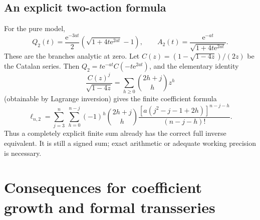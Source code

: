 \documentclass[11pt,a4paper]{article}
\numberwithin{equation}{section}
\theoremstyle{definition}
\theoremstyle{remark}\newtheorem{remark}[theorem]{Remark}
\newcommand{\ee}{\mathrm e}\newcommand{\dd}{\mathrm d}
\begin{document}
\subsection{An explicit two-action formula}
For the pure model,
\begin{equation}
 Q_2(t)=\frac{\ee^{-3at}}2\left(\sqrt{1+4t\ee^{2at}}-1\right),\qquad
 A_2(t)=\frac{\ee^{-at}}{\sqrt{1+4t\ee^{2at}}}.
 \label{eq:Q2}
\end{equation}
These are the branches analytic at zero. Let
$C(z)=(1-\sqrt{1-4z})/(2z)$ be the Catalan series.
Then $Q_2=t\ee^{-at}C(-t\ee^{2at})$, and the elementary identity
\[
 \frac{C(z)^j}{\sqrt{1-4z}}=
 \sum_{h\ge0}\binom{2h+j}{h}z^h
\]
(obtainable by Lagrange inversion) gives the finite coefficient formula
\begin{equation}
 \ell_{n,2}=\sum_{j=3}^n\ \sum_{h=0}^{n-j}
 (-1)^h\binom{2h+j}{h}
 \frac{\left[a(j^2-j-1+2h)\right]^{n-j-h}}{(n-j-h)!}.
 \label{eq:L2exact}
\end{equation}
Thus a completely explicit finite sum already has the correct full inverse
equivalent. It is still a signed sum; exact arithmetic or adequate working
precision is necessary.

\section{Consequences for coefficient growth and formal transseries}
\label{sec:consequences}
\end{document}
